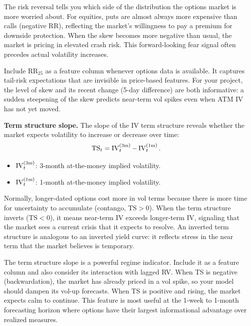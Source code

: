 \begin{intuition}
The risk reversal tells you which side of the distribution the options market is more worried about. For equities, puts are almost always more expensive than calls (negative RR), reflecting the market's willingness to pay a premium for downside protection. When the skew becomes more negative than usual, the market is pricing in elevated crash risk. This forward-looking fear signal often precedes actual volatility increases.
\end{intuition}

\begin{projectconnection}
Include $\text{RR}_{25}$ as a feature column whenever options data is available. It captures tail-risk expectations that are invisible in price-based features. For your project, the level of skew and its recent change (5-day difference) are both informative: a sudden steepening of the skew predicts near-term vol spikes even when ATM IV has not yet moved.
\end{projectconnection}

\textbf{Term structure slope.}
The slope of the IV term structure reveals whether the market expects volatility to increase or decrease over time:
\begin{equation}\label{eq:ts-slope}
\text{TS}_t = \operatorname{IV}_t^{(3\text{m})} - \operatorname{IV}_t^{(1\text{m})}.
\end{equation}
\begin{itemize}[nosep]
  \item $\operatorname{IV}_t^{(3\text{m})}$: 3-month at-the-money implied volatility.
  \item $\operatorname{IV}_t^{(1\text{m})}$: 1-month at-the-money implied volatility.
\end{itemize}

\begin{intuition}
Normally, longer-dated options cost more in vol terms because there is more time for uncertainty to accumulate (contango, $\text{TS} > 0$). When the term structure inverts ($\text{TS} < 0$), it means near-term IV exceeds longer-term IV, signaling that the market sees a current crisis that it expects to resolve. An inverted term structure is analogous to an inverted yield curve: it reflects stress in the near term that the market believes is temporary.
\end{intuition}

\begin{projectconnection}
The term structure slope is a powerful regime indicator. Include it as a feature column and also consider its interaction with lagged RV. When TS is negative (backwardation), the market has already priced in a vol spike, so your model should dampen its vol-up forecasts. When TS is positive and rising, the market expects calm to continue. This feature is most useful at the 1-week to 1-month forecasting horizon where options have their largest informational advantage over realized measures.
\end{projectconnection}

